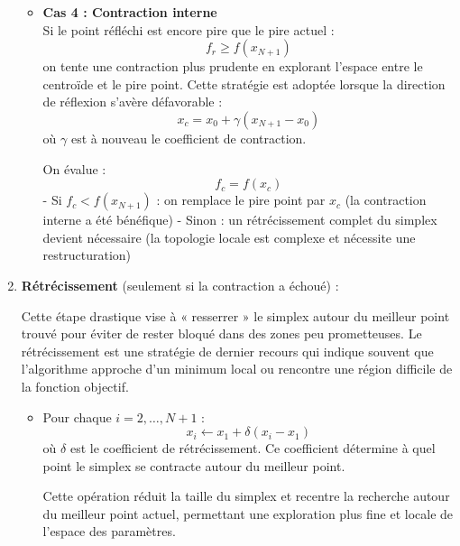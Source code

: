 \begin{enumerate}
\begin{itemize}
\vspace{1em}
    
       \item \textbf{Cas 4 : Contraction interne} \\
       Si le point réfléchi est encore pire que le pire actuel :
       \begin{equation}
       f_r \geq f(x_{N+1})
       \end{equation}
       on tente une contraction plus prudente en explorant l'espace entre le centroïde et le pire point. Cette stratégie est adoptée lorsque la direction de réflexion s'avère défavorable :
       \begin{equation}
       x_c = x_0 + \gamma (x_{N+1} - x_0)
       \end{equation}
       où $\gamma$ est à nouveau le coefficient de contraction.
       
       On évalue :
       \begin{equation}
       f_c = f(x_c)
       \end{equation}
       - Si $f_c < f(x_{N+1})$ : on remplace le pire point par $x_c$ (la contraction interne a été bénéfique)
       - Sinon : un rétrécissement complet du simplex devient nécessaire (la topologie locale est complexe et nécessite une restructuration)
       \end{itemize}

\vspace{1em}

    \item \textbf{Rétrécissement} (seulement si la contraction a échoué) :
    
       Cette étape drastique vise à « resserrer » le simplex autour du meilleur point trouvé pour éviter de rester bloqué dans des zones peu prometteuses. Le rétrécissement est une stratégie de dernier recours qui indique souvent que l'algorithme approche d'un minimum local ou rencontre une région difficile de la fonction objectif.
    
       \begin{itemize}
       \item Pour chaque $i = 2, \ldots, N+1$ :
       \begin{equation}
       x_i \leftarrow x_1 + \delta (x_i - x_1)
       \end{equation}
       où $\delta$ est le coefficient de rétrécissement. Ce coefficient détermine à quel point le simplex se contracte autour du meilleur point.
       
       Cette opération réduit la taille du simplex et recentre la recherche autour du meilleur point actuel, permettant une exploration plus fine et locale de l'espace des paramètres.
       \end{itemize}
    \end{enumerate}
    
